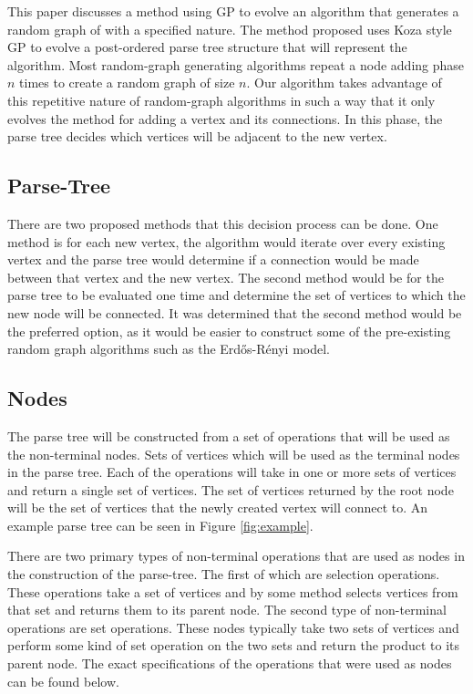 \documentclass{article}
\begin{document}
This paper discusses a method using GP to evolve an algorithm that generates a random graph 
of with a specified nature.  The method proposed uses Koza style GP to evolve a post-ordered 
parse tree structure that will represent the algorithm. Most random-graph generating algorithms 
repeat a node adding phase $n$ times to create a random graph of size $n$. Our algorithm takes 
advantage of this repetitive nature of random-graph algorithms in such a way that it only 
evolves the method for adding a vertex and its connections. In this phase, the parse tree decides 
which vertices will be adjacent to the new vertex.


\subsection{Parse-Tree}
There are two proposed methods that this decision process can be done. One method is for each new vertex, 
the algorithm would iterate over every existing vertex and the parse tree would determine if a 
connection would be made between that vertex and the new vertex. The second method would be for the parse 
tree to be evaluated one time and determine the set of vertices to which the new node will be connected.  
It was determined that the second method would be the preferred option, as it would be easier to 
construct some of the pre-existing random graph algorithms such as the Erd\H{o}s-R\'{e}nyi model.

\subsection{Nodes}
The parse tree will be constructed from a set of operations that will be used as the non-terminal 
nodes. Sets of vertices which will be used as the terminal nodes in the parse tree.  Each of the operations will take 
in one or more sets of vertices and return a single set of vertices. The set of vertices returned by the 
root node will be the set of vertices that the newly created vertex will connect to. 
An example parse tree can be seen in Figure \ref{fig:example}.

There are two primary types of non-terminal operations that are used as nodes in the construction of the parse-tree. The
first of which are selection operations. These operations take a set of vertices and by some method selects vertices from
that set and returns them to its parent node. The second type of non-terminal operations are set operations. These nodes 
typically take two sets of vertices and perform some kind of set operation on the two sets and return the product to its
parent node. The exact specifications of the operations that were used as nodes can be found below.
\end{document}

